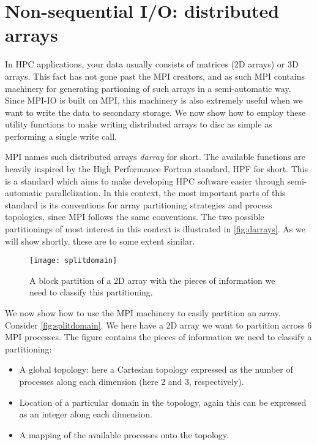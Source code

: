 \section{Non-sequential I/O: distributed arrays}

In HPC applications, your data usually consists of matrices (2D arrays) or 3D
arrays. This fact has not gone past the MPI creators, and as such MPI contains
machinery for generating partioning of such arrays in a semi-automatic way.
Since MPI-IO is built on MPI, this machinery is also extremely useful when we
want to write the data to secondary storage. We now show how to employ these
utility functions to make writing distributed arrays to disc as simple as
performing a single write call.

MPI names such distributed arrays \emph{darray} for short. The available
functions are heavily inspired by the High Performance Fortran standard, HPF for
short. This is a standard which aims to make developing HPC software easier
through semi-automatic parallelization. In this context, the most important
parts of this standard is its conventions for array partitioning strategies and
process topologies, since MPI follows the same conventions. The two possible
partitionings of most interest in this context is illustrated in
\autoref{fig:darrays}. As we will show shortly, these are to some extent
similar.

\begin{figure}
  \begin{center}
    \texttt{[image: splitdomain]}
  \end{center}
  \caption{
    A block partition of a 2D array with the pieces of information we need to
    classify this partitioning.
  }
  \label{fig:splitdomain}
\end{figure}

We now show how to use the MPI machinery to easily partition an array. Consider
\autoref{fig:splitdomain}. We here have a 2D array we want to partition across 6
MPI processes. The figure contains the pieces of information we need to classify
a partitioning:
\begin{itemize}
\item A global topology: here a Cartesian topology expressed as the number
  of processes along each dimension (here 2 and 3, respectively).
\item Location of a particular domain in the topology, again
  this can be expressed as an integer along each dimension.
\item A mapping of the available processes onto the topology.
\end{itemize}

